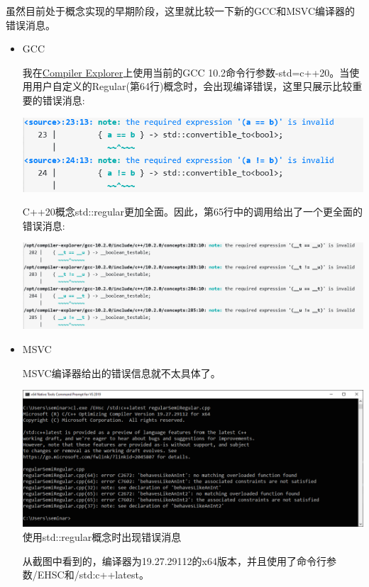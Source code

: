 虽然目前处于概念实现的早期阶段，这里就比较一下新的GCC和MSVC编译器的错误消息。

\begin{itemize}
\item
GCC

我在\href{https://godbolt.org/}{Compiler Explorer}上使用当前的GCC 10.2命令行参数-std=c++20。当使用用户自定义的Regular(第64行)概念时，会出现编译错误，这里只展示比较重要的错误消息:

\begin{center}
\includegraphics[width=1.0\textwidth]{content/3/chapter4/images/1-6.png}\\
\end{center}

C++20概念std::regular更加全面。因此，第65行中的调用给出了一个更全面的错误消息:

\begin{center}
\includegraphics[width=1.0\textwidth]{content/3/chapter4/images/1-7.png}\\
\end{center}

\item
MSVC

MSVC编译器给出的错误信息就不太具体了。

\begin{center}
\includegraphics[width=1.0\textwidth]{content/3/chapter4/images/10.png}\\
使用std::regular概念时出现错误消息
\end{center}

从截图中看到的，编译器为19.27.29112的x64版本，并且使用了命令行参数/EHSC和/std:c++latest。

\end{itemize}

